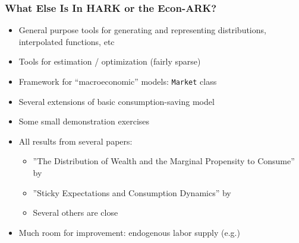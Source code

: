 \documentclass[11ptt]{beamer}
\begin{document}

\begin{frame}
  \frametitle{What Else Is In HARK or the Econ-ARK?}

  \begin{itemize}
  \item General purpose tools for generating and representing distributions, interpolated functions, etc

  \item Tools for estimation / optimization (fairly sparse)

  \item Framework for ``macroeconomic'' models: \texttt{Market} class

  \item Several extensions of basic consumption-saving model

  \item Some small demonstration exercises

  \item All results from several papers:
\begin{itemize}
  \item ''The Distribution of Wealth and the Marginal Propensity to Consume'' by \cite{cstwMPC}

  \item ''Sticky Expectations and Consumption Dynamics'' by \cite{cAndCwithStickyE}

    \item Several others are close
  \end{itemize}
  
    
  \item Much room for improvement: endogenous labor supply (e.g.)

  \end{itemize}

\end{frame}
\end{document}
